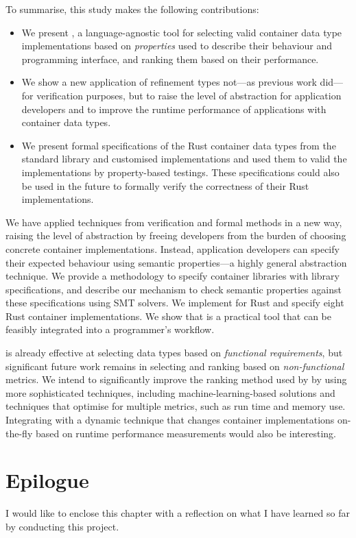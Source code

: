 To summarise, this study makes the following contributions:
\begin{itemize}
    \item We present \Primrose{}, a language-agnostic tool for selecting valid container data type implementations based on \emph{properties} used to describe their behaviour and programming interface, and ranking them based on their performance.
    \item We show a new application of refinement types not---as previous work did---for verification purposes, but to raise the level of abstraction for application developers and to improve the runtime performance of applications with container data types.
    \item We present formal specifications of the Rust container data types from the standard library and customised implementations and used them to valid the implementations by property-based testings. These specifications could also be used in the future to formally verify the correctness of their Rust implementations.
\end{itemize}

We have applied techniques from verification and formal methods in a new way, raising the level of abstraction by freeing developers from the burden of choosing concrete container implementations.
Instead, application developers can specify their expected behaviour using semantic properties---a highly general abstraction technique.
We provide a methodology to specify container libraries with library specifications, and describe our mechanism to check semantic properties against these specifications using SMT solvers. 
We implement \Primrose{} for Rust and specify eight Rust container implementations. We show that \Primrose{} is a practical tool that can be feasibly integrated into a programmer's workflow.

\Primrose{} is already effective at selecting data types based on \emph{functional requirements}, but significant future work remains in selecting and ranking based on \emph{non-functional} metrics. 
We intend to significantly improve the ranking method used by \Primrose{} by using 
more sophisticated techniques, including machine-learning-based solutions and techniques that optimise for multiple metrics, such as run time and memory use.
Integrating \Primrose{} with a dynamic technique that changes container implementations on-the-fly based on runtime performance measurements would also be interesting.

\section{Epilogue}
\label{chap2:epilogue}
I would like to enclose this chapter with a reflection on what I have learned so far by conducting this project.

